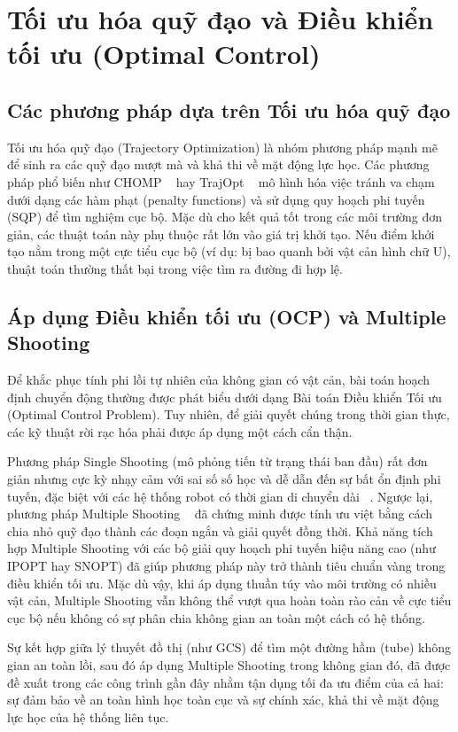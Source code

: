 \section{Tối ưu hóa quỹ đạo và Điều khiển tối ưu (Optimal Control)}

\subsection{Các phương pháp dựa trên Tối ưu hóa quỹ đạo}
Tối ưu hóa quỹ đạo (Trajectory Optimization) là nhóm phương pháp mạnh mẽ để sinh ra các quỹ đạo mượt mà và khả thi về mặt động lực học. Các phương pháp phổ biến như CHOMP ~\cite{Zucker2013_CHOMP} hay TrajOpt ~\cite{Schulman2014_TrajOpt} mô hình hóa việc tránh va chạm dưới dạng các hàm phạt (penalty functions) và sử dụng quy hoạch phi tuyến (SQP) để tìm nghiệm cục bộ. Mặc dù cho kết quả tốt trong các môi trường đơn giản, các thuật toán này phụ thuộc rất lớn vào giá trị khởi tạo. Nếu điểm khởi tạo nằm trong một cực tiểu cục bộ (ví dụ: bị bao quanh bởi vật cản hình chữ U), thuật toán thường thất bại trong việc tìm ra đường đi hợp lệ.

\subsection{Áp dụng Điều khiển tối ưu (OCP) và Multiple Shooting}
Để khắc phục tính phi lồi tự nhiên của không gian có vật cản, bài toán hoạch định chuyển động thường được phát biểu dưới dạng Bài toán Điều khiển Tối ưu (Optimal Control Problem). Tuy nhiên, để giải quyết chúng trong thời gian thực, các kỹ thuật rời rạc hóa phải được áp dụng một cách cẩn thận. 

Phương pháp Single Shooting (mô phỏng tiến từ trạng thái ban đầu) rất đơn giản nhưng cực kỳ nhạy cảm với sai số số học và dễ dẫn đến sự bất ổn định phi tuyến, đặc biệt với các hệ thống robot có thời gian di chuyển dài ~\cite{BockPlitt1984}. Ngược lại, phương pháp Multiple Shooting ~\cite{DiehlEtAl2006} đã chứng minh được tính ưu việt bằng cách chia nhỏ quỹ đạo thành các đoạn ngắn và giải quyết đồng thời. Khả năng tích hợp Multiple Shooting với các bộ giải quy hoạch phi tuyến hiệu năng cao (như IPOPT hay SNOPT) đã giúp phương pháp này trở thành tiêu chuẩn vàng trong điều khiển tối ưu. Mặc dù vậy, khi áp dụng thuần túy vào môi trường có nhiều vật cản, Multiple Shooting vẫn không thể vượt qua hoàn toàn rào cản về cực tiểu cục bộ nếu không có sự phân chia không gian an toàn một cách có hệ thống.

Sự kết hợp giữa lý thuyết đồ thị (như GCS) để tìm một đường hầm (tube) không gian an toàn lồi, sau đó áp dụng Multiple Shooting trong không gian đó, đã được đề xuất trong các công trình gần đây nhằm tận dụng tối đa ưu điểm của cả hai: sự đảm bảo về an toàn hình học toàn cục và sự chính xác, khả thi về mặt động lực học của hệ thống liên tục.
